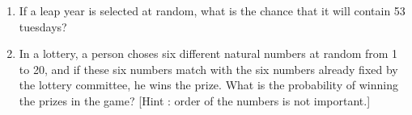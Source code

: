 \begin{enumerate}[label=\thesubsection.\arabic*,ref=\thesubsection.\theenumi]
\item If a leap year is selected at random, what is the chance that it will contain 53 tuesdays?
	\\
		\solution
		
\item In a lottery, a person choses six different natural numbers at random from 1 to 20, and if these six numbers match with the six numbers already fixed by the lottery committee, he wins  the prize. What is the probability of winning the prizes in the game? [Hint : order of the numbers is not important.]
	\\
\solution

\end{enumerate}
